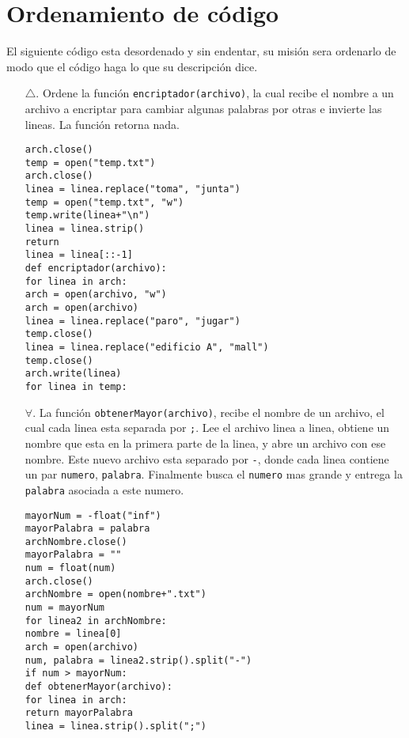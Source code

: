 \section{Ordenamiento de código}

El siguiente código esta desordenado y sin endentar, su misión sera ordenarlo de modo que el código haga lo que su descripción dice.

\begin{enumerate}

\item[$\triangle$.] Ordene la función \texttt{encriptador(archivo)}, la cual recibe el nombre a un archivo a encriptar para cambiar algunas palabras por otras e invierte las lineas. La función retorna nada.

\begin{lstlisting}[style=consola]
arch.close()
temp = open("temp.txt")
arch.close()
linea = linea.replace("toma", "junta")
temp = open("temp.txt", "w")
temp.write(linea+"\n")
linea = linea.strip()
return
linea = linea[::-1]
def encriptador(archivo):
for linea in arch:
arch = open(archivo, "w")
arch = open(archivo)
linea = linea.replace("paro", "jugar")
temp.close()
linea = linea.replace("edificio A", "mall")
temp.close()
arch.write(linea)
for linea in temp:
\end{lstlisting}


\item[$\forall$.] La función \texttt{obtenerMayor(archivo)}, recibe el nombre de un archivo, el cual cada linea esta separada por \texttt{;}. Lee el archivo linea a linea, obtiene un nombre que esta en la primera parte de la linea, y abre un archivo con ese nombre. Este nuevo archivo esta separado por \texttt{-}, donde cada linea contiene un par \texttt{numero}, \texttt{palabra}. Finalmente busca el \texttt{numero} mas grande y entrega la \texttt{palabra} asociada a este numero.

\begin{lstlisting}[style=consola]
mayorNum = -float("inf")
mayorPalabra = palabra
archNombre.close()
mayorPalabra = ""
num = float(num)
arch.close()
archNombre = open(nombre+".txt")
num = mayorNum
for linea2 in archNombre:
nombre = linea[0]
arch = open(archivo)
num, palabra = linea2.strip().split("-")
if num > mayorNum:
def obtenerMayor(archivo):
for linea in arch:
return mayorPalabra
linea = linea.strip().split(";")
\end{lstlisting}

\end{enumerate}
